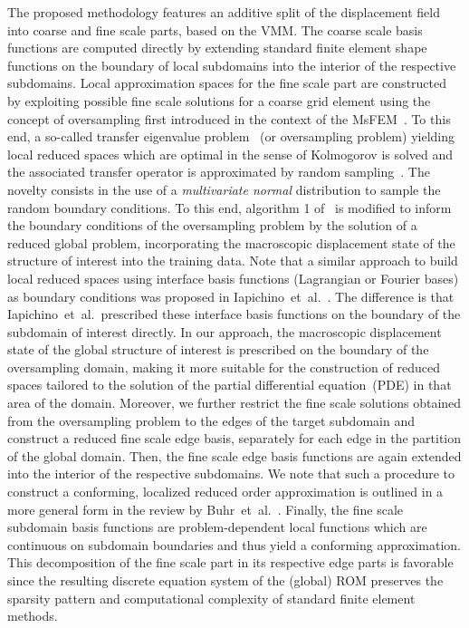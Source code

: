 \documentclass[AMA,STIX1COL,doublespace]{WileyNJD-v2}
\begin{document}
The proposed methodology features an additive split of the displacement field
into coarse and fine scale parts, based on the VMM\@.
The coarse scale basis functions are computed directly by extending standard
finite element shape functions on the boundary of local subdomains into
the interior of the respective subdomains.
Local approximation spaces for the fine scale part are constructed by exploiting possible fine scale solutions for a coarse grid element using the concept of oversampling first introduced in the context of the MsFEM~\cite{HW1997}.
To this end, a so-called transfer eigenvalue problem~\cite{BabuskaLipton2011,SmetanaPatera2016} (or oversampling problem) yielding local reduced spaces which are optimal in the sense of Kolmogorov is solved and the associated transfer operator is approximated by random sampling~\cite{BS2018}.
The novelty consists in the use of a \textit{multivariate normal} distribution 
to sample the random boundary conditions.
To this end, algorithm 1 of~\cite{BS2018} is modified to inform the boundary
conditions of the oversampling problem by the solution of a reduced global problem,
incorporating the macroscopic displacement state of the structure of interest
into the training data.
Note that a similar approach to build local reduced spaces using interface basis functions (Lagrangian or Fourier bases) as boundary conditions was proposed in Iapichino~et~al.~\cite{IapichinoQuarteroniRozza2016}.
The difference is that Iapichino~et~al.\ prescribed these interface basis functions on the boundary of the subdomain of interest directly.
In our approach, the macroscopic displacement state of the global structure of interest is prescribed on the boundary of the oversampling domain, making it more suitable for the construction of reduced spaces tailored to the solution of the partial differential equation~(PDE) in that area of the domain.
Moreover, we further restrict the fine scale solutions obtained from the oversampling problem to the edges of the target subdomain and  construct a reduced fine scale edge basis, separately for each edge in the partition of the global domain.
Then, the fine scale edge basis functions are again extended into the interior
of the respective subdomains.
We note that such a procedure to construct a conforming, localized reduced order approximation is outlined in a more general form in the review by Buhr~et~al.~\cite{BuhrEtAlInBook2020}.
Finally, the fine scale subdomain basis functions are problem-dependent local functions which are continuous on subdomain boundaries and thus yield a conforming approximation.
This decomposition of the fine scale part in its respective edge parts is favorable since the resulting discrete equation system of the (global) ROM preserves the sparsity pattern and computational complexity of standard finite element methods.
\end{document}
